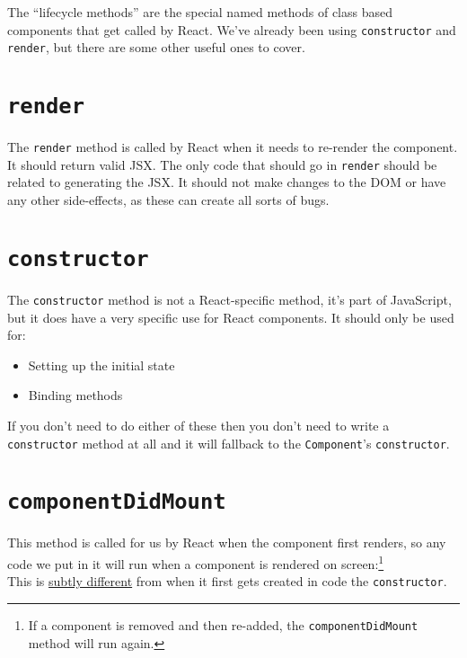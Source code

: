 The ``lifecycle methods'' are the special named methods of class based components that get called by React. We've already been using \texttt{constructor} and \texttt{render}, but there are some other useful ones to cover.


\section{\texttt{render}}

The \texttt{render} method is called by React when it needs to re-render the component. It should return valid JSX. The only code that should go in \texttt{render} should be related to generating the JSX. It should not make changes to the DOM or have any other side-effects, as these can create all sorts of bugs.


\section{\texttt{constructor}}

The \texttt{constructor} method is not a React-specific method, it's part of JavaScript, but it does have a very specific use for React components. It should only be used for:

\begin{itemize}
    \item Setting up the initial state
    \item Binding methods
\end{itemize}

If you don't need to do either of these then you don't need to write a \texttt{constructor} method at all and it will fallback to the \texttt{Component}'s \texttt{constructor}.


\section{\texttt{componentDidMount}}

This method is called for us by React when the component first renders, so any code we put in it will run when a component is rendered on screen:\footnote{If a component is removed and then re-added, the \texttt{componentDidMount} method will run again.}
\\

This is \href{https://medium.com/@mahcloud/actions-in-the-constructor-or-componentdidmount-be3720e4a9a6}{subtly different} from when it first gets created in code the \texttt{constructor}.
\\

